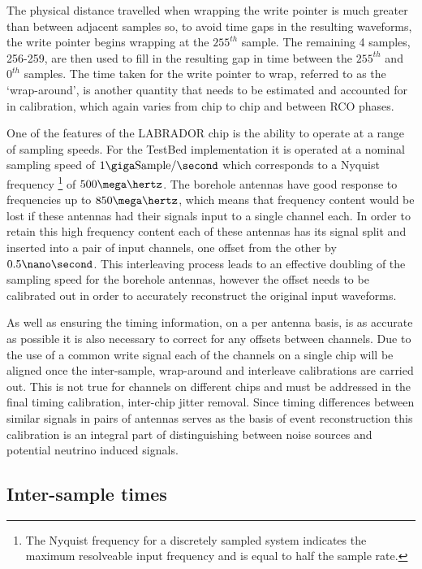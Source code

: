 The physical distance travelled when wrapping the write pointer is much greater than between adjacent samples so, to avoid time gaps in the resulting waveforms, the write pointer begins wrapping at the $255^{th}$ sample. The remaining 4 samples, 256-259, are then used to fill in the resulting gap in time between the $255^{th}$ and $0^{th}$ samples.  The time taken for the write pointer to wrap, referred to as the `wrap-around', is another quantity that needs to be estimated and accounted for in calibration, which again varies from chip to chip and between RCO phases.



One of the features of the LABRADOR chip is the ability to operate at a range of sampling speeds. For the TestBed implementation it is operated at a nominal sampling speed of $1 \giga \mbox{Sample} /\second$ which corresponds to a Nyquist frequency \footnote{The Nyquist frequency for a discretely sampled system indicates the maximum resolveable input frequency and is equal to half the sample rate.} of $500 \mega \hertz$. The borehole antennas have good response to frequencies up to $850 \mega \hertz$, which means that frequency content would be lost if these antennas had their signals input to a single channel each. In order to retain this high frequency content each of these antennas has its signal split and inserted into a pair of input channels, one offset from the other by $0.5 \nano \second$. This interleaving process leads to an effective doubling of the sampling speed for the borehole antennas, however the offset needs to be calibrated out in order to accurately reconstruct the original input waveforms. 

As well as ensuring the timing information, on a per antenna basis, is as accurate as possible it is also necessary to correct for any offsets between channels. Due to the use of a common write signal each of the channels on a single chip will be aligned once the inter-sample, wrap-around and interleave calibrations are carried out. This is not true for channels on different chips and must be addressed in the final timing calibration, inter-chip jitter removal. Since timing differences between similar signals in pairs of antennas serves as the basis of event reconstruction this calibration is an integral part of distinguishing between noise sources and potential neutrino induced signals. 

\subsection{Inter-sample times}
\label{sec:calibration:LABRADOR-Digitiser-Chip:Inter-sample-times}


